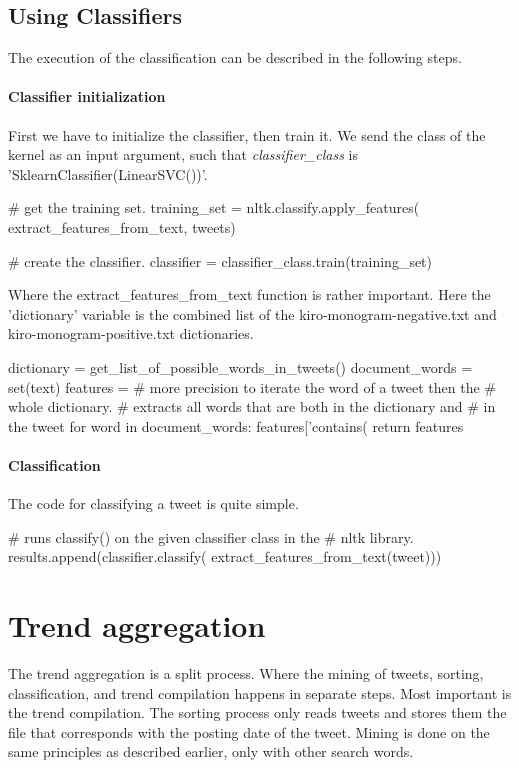 \subsection{Using Classifiers}\label{code:classifier_classification}
The execution of the classification can be described in the following steps. 

\paragraph{Classifier initialization}
First we have to initialize the classifier, then train it. We send the class of
the kernel as an input argument, such that \textit{classifier\_class} is
'SklearnClassifier(LinearSVC())'.
\begin{python}
# get the training set.
training_set = nltk.classify.apply_features(
    extract_features_from_text,
    tweets)

# create the classifier.
classifier = classifier_class.train(training_set)
\end{python}

Where the extract\_features\_from\_text function is rather important. Here the
'dictionary' variable is the combined list of the kiro-monogram-negative.txt and
kiro-monogram-positive.txt dictionaries.
\begin{python}
dictionary = get_list_of_possible_words_in_tweets()
document_words = set(text)
features = {}
# more precision to iterate the word of a tweet then the 
# whole dictionary.
# extracts all words that are both in the dictionary and 
# in the tweet
for word in document_words:
    features['contains(%
return features
\end{python}

\paragraph{Classification}
The code for classifying a tweet is quite simple. 
\begin{python}
# runs classify() on the given classifier class in the 
# nltk library.
results.append(classifier.classify(
    extract_features_from_text(tweet)))
\end{python}

\section{Trend aggregation}\label{code:trend_aggregation}
The trend aggregation is a split process. Where the mining of tweets, sorting,
classification, and trend compilation happens in separate steps. Most important
is the trend compilation. The sorting process only reads tweets
and stores them the file that corresponds with the posting date of the tweet.
Mining is done on the same principles as described earlier, only with other
search words. 

